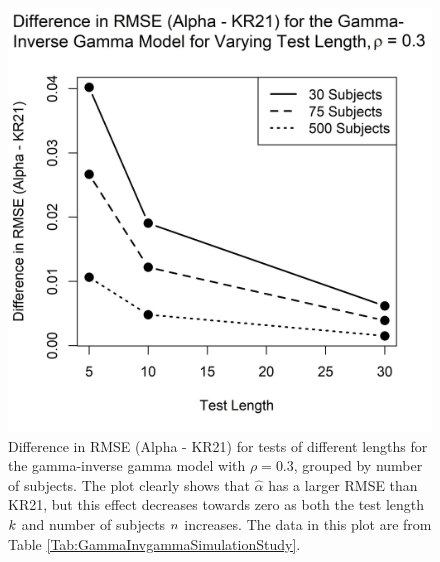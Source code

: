 \documentclass[12pt,epsfig]{article}
\newcommand{\changed}[1]{\textcolor{black}{#1}}
\newcommand{\numsubjects}{\changed{n}}%
\newcommand{\testlength}{\changed{k}}%
\begin{document}
\begin{figure}[ht] \centering
\includegraphics{GGPlot}
\caption{\color{black} Difference in RMSE (Alpha - KR21) for tests of different lengths for the gamma-inverse gamma model with $\rho = 0.3$, grouped by number of subjects. The plot clearly shows that $\hat{\alpha}$ has a larger RMSE than KR21, but this effect decreases towards zero as both the test length $\testlength$ and number of subjects $\numsubjects$ increases. The data in this plot are from Table \ref{Tab:GammaInvgammaSimulationStudy}.}
\label{Fig:GGPlot}
\end{figure}
\end{document}
